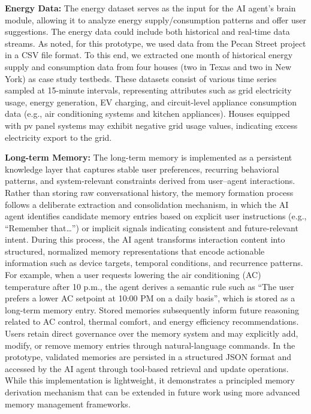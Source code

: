 \documentclass[final,3p,times]{elsarticle}
\begin{document}
\textbf{Energy Data:} The energy dataset serves as the input for the AI agent’s brain module, allowing it to analyze energy supply/consumption patterns and offer user suggestions. The energy data could include both historical and real-time data streams. As noted, for this prototype, we used data from the Pecan Street project in a CSV file format. To this end, we extracted one month of historical energy supply and consumption data from four houses (two in Texas and two in New York) as case study testbeds. These datasets consist of various time series sampled at 15-minute intervals, representing attributes such as grid electricity usage, energy generation, EV charging, and circuit-level appliance consumption data (e.g., air conditioning systems and kitchen appliances). Houses equipped with pv panel systems may exhibit negative grid usage values, indicating excess electricity export to the grid. 

\textbf{Long-term Memory:} The long-term memory is implemented as a persistent knowledge layer that captures stable user preferences, recurring behavioral patterns, and system-relevant constraints derived from user–agent interactions. Rather than storing raw conversational history, the memory formation process follows a deliberate extraction and consolidation mechanism, in which the AI agent identifies candidate memory entries based on explicit user instructions (e.g., “Remember that…”) or implicit signals indicating consistent and future-relevant intent. During this process, the AI agent transforms interaction content into structured, normalized memory representations that encode actionable information such as device targets, temporal conditions, and recurrence patterns. For example, when a user requests lowering the air conditioning (AC) temperature after 10 p.m., the agent derives a semantic rule such as “The user prefers a lower AC setpoint at 10:00 PM on a daily basis”, which is stored as a long-term memory entry. Stored memories subsequently inform future reasoning related to AC control, thermal comfort, and energy efficiency recommendations. Users retain direct governance over the memory system and may explicitly add, modify, or remove memory entries through natural-language commands. In the prototype, validated memories are persisted in a structured JSON format and accessed by the AI agent through tool-based retrieval and update operations. While this implementation is lightweight, it demonstrates a principled memory derivation mechanism that can be extended in future work using more advanced memory management frameworks.
\end{document}
